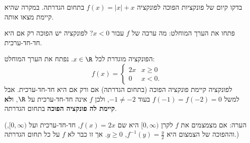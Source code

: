 
\begin{question}
בדקו קיום של פונקציות הפוכה לפונקציה $f(x)=|x|+x$ בתחום הגדרתה. במקרה שהיא קיימת מצאו אותה.
\end{question}

\begin{hint}
פתחו את הערך המוחלט: מה ערכה של $f$ עבור $x<0$? לפונקציה יש הפוכה רק אם היא חד-חד-ערכית.
\end{hint}

\begin{solution}
הפונקציה מוגדרת לכל $x\in\R$. נפתח את הערך המוחלט:
\[ f(x)=\begin{cases} 2x & x\ge 0\\ 0 & x<0.\end{cases} \]
לפונקציה קיימת פונקציה הפוכה (בתחום הגדרתה) אם ורק אם היא חד-חד-ערכית. אבל למשל $f(-1)=f(-2)=0$ בעוד $-1\neq -2$, ולכן $f$ אינה חד-חד-ערכית על $\R$, ו\textbf{לא קיימת לה פונקציה הפוכה} בתחום הגדרתה.

(הערה: אם מצמצמים את $f$ לקרן $[0,\infty)$ היא שם $f(x)=2x$, חד-חד-ערכית ועל $[0,\infty)$, וההפוכה של הצמצום היא $f^{-1}(y)=\frac{y}{2}$, $y\ge 0$. אך זו כבר לא $f$ על כל תחום הגדרתה.)
\end{solution}
